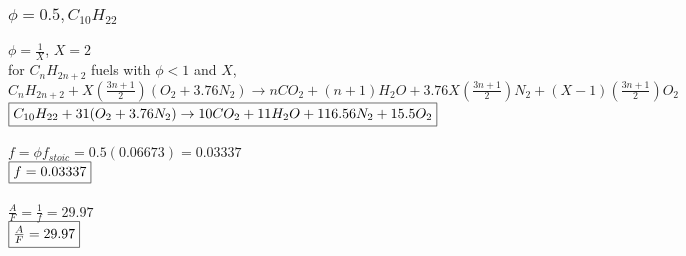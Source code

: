 \documentclass{article}
\begin{document}
\subsubsection*{$\phi=0.5, C_{10}H_{22}$}
$\phi=\frac{1}{X}$, $X=2$ \\
for $C_nH_{2n+2}$ fuels with $\phi<1$ and $X$, \\
$C_nH_{2n+2}+X(\frac{3n+1}{2})(O_2+3.76N_2) \rightarrow nCO_2 + (n+1)H_2O +3.76X(\frac{3n+1}{2})N_2 +
(X-1)(\frac{3n+1}{2})O_2$ \\
$\fbox{$C_{10}H_{22}+31(O_2+3.76N_2) \rightarrow 10CO_2+11H_2O+116.56N_2+15.5O_2$}$ \\\\
$f=\phi f_{stoic}=0.5(0.06673)=0.03337$ \\
$\fbox{$f=0.03337$}$ \\\\
$\frac{A}{F}=\frac{1}{f}=29.97$ \\
$\fbox{$\frac{A}{F}=29.97$}$
\end{document}

